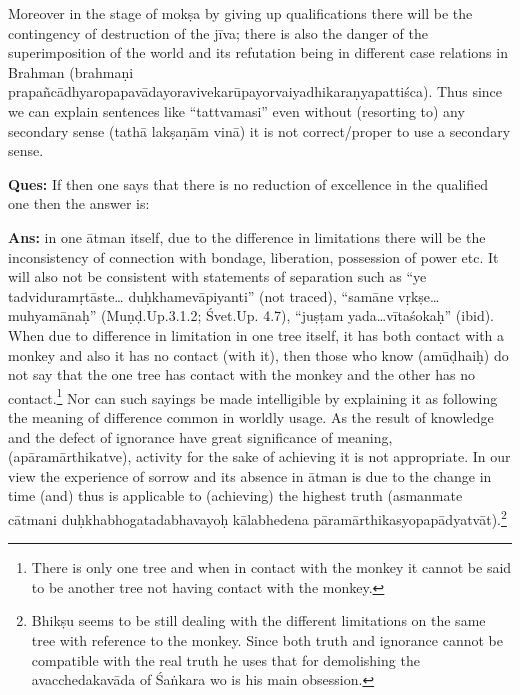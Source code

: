Moreover in the stage of mokṣa by giving up qualifications there will be the contingency of destruction of the jīva; there is also the danger of the superimposition of the world and its refutation being in different case relations   in Brahman (brahmaṇi prapañcādhyaropapavādayoravivekarūpayorvaiyadhikaraṇyapattiśca). Thus since we can explain sentences like “tattvamasi” even without (resorting to) any secondary sense (tathā lakṣaṇām vinā) it is not correct/proper to use a secondary sense.

\textbf{Ques:} If then one says that there is no reduction of excellence in the qualified one then the answer is:

\textbf{Ans:} in one ātman itself, due to the difference in limitations there will be the inconsistency of connection with bondage, liberation, possession of power etc. It will also not be consistent with statements of separation such as “ye tadviduramṛtāste…   duḥkhamevāpiyanti” (not traced), “samāne vṛkṣe…muhyamānaḥ” (Muṇḍ.Up.3.1.2; Śvet.Up. 4.7), “juṣṭam yada…vītaśokaḥ” (ibid). When due to difference in limitation in one tree itself, it has both contact with a monkey and also it has no contact (with it), then those who know (amūḍhaiḥ) do not say that the one tree has contact with the monkey and the other has no contact.\footnote{There is only one tree and when in contact with the monkey it cannot be said to be another tree not having contact with the monkey.} Nor can such sayings be made intelligible by explaining it as following the meaning of difference common in worldly usage. As the result of knowledge and the defect of ignorance have great significance of meaning, (apāramārthikatve), activity for the sake of achieving it is not appropriate. In our view the experience of sorrow and its absence in ātman is due to the change in time (and) thus is applicable to (achieving) the highest truth (asmanmate cātmani duḥkhabhogatadabhavayoḥ kālabhedena pāramārthikasyopapādyatvāt).\footnote{Bhikṣu seems to be still dealing with the different limitations on the same tree with reference to the monkey. Since both truth and ignorance cannot be compatible with the real truth he uses that for demolishing the avacchedakavāda of Śaṅkara wo is his main obsession.} 


